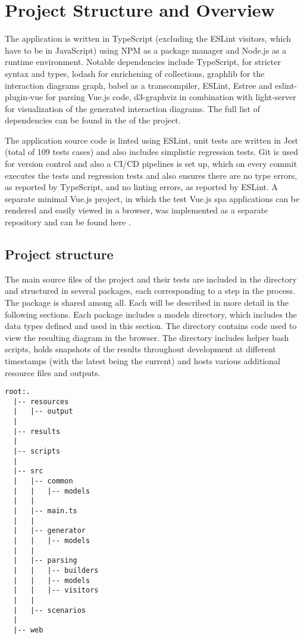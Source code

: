 \section{Project Structure and Overview}
The application is written in TypeScript (excluding the ESLint visitors, which have to be in JavaScript) using NPM as a package manager and Node.js as a runtime environment. Notable dependencies include TypeScript\parencite{typescript}, for stricter syntax and types, lodash\parencite{lodash} for enrichening of collections, graphlib\parencite{graphlib} for the interaction diagrams graph,  babel\parencite{babel} as a transcompiler, ESLint\parencite{eslintMainPage}, Estree\parencite{estreeASTSpec} and eslint-plugin-vue\parencite{eslint_vue_parser} for parsing Vue.js code, d3-graphviz\parencite{graph_viz} in combination with light-server\parencite{light_server} for visualization of the generated interaction diagrams. The full list of dependencies can be found in the  of the project.

The application source code is linted using ESLint, unit tests are written in Jest (total of 109 tests cases) and also includes simplistic regression tests. Git is used for version control and also a CI/CD pipelines is set up, which on every commit executes the tests and regression tests and also ensures there are no type errors, as reported by TypeScript, and no linting errors, as reported by ESLint. 
A separate minimal Vue.js project, in which the test Vue.js \gls{spa} applications can be rendered and easily viewed in a browser, was implemented as a separate repository and can be found here \parencite{KarakoA2021Feb}.

\subsection{Project structure}
The main source files of the project and their tests are included in the  directory and structured in several packages, each corresponding to a step in the process. The  package is shared among all. Each will be described in more detail in the following sections.
Each package includes a models directory, which includes the data types defined and used in this section.
The  directory contains code used to view the resulting diagram in the browser.
The  directory includes helper bash scripts,  holds snapshots of the results throughout development at different timestamps (with the latest being the current) and  hosts various additional resource files and outputs.
\newpage
\begin{lstlisting}[basicstyle=\tiny,caption={Directory structure of the project}, captionpos=b]
  root:.
  |-- resources
  |   |-- output
  |
  |-- results
  |
  |-- scripts
  |
  |-- src
  |   |-- common
  |   |   |-- models
  |   |
  |   |-- main.ts
  |   |
  |   |-- generator
  |   |   |-- models
  |   |
  |   |-- parsing
  |   |   |-- builders
  |   |   |-- models
  |   |   |-- visitors
  |   |
  |   |-- scenarios
  |
  |-- web
\end{lstlisting}

